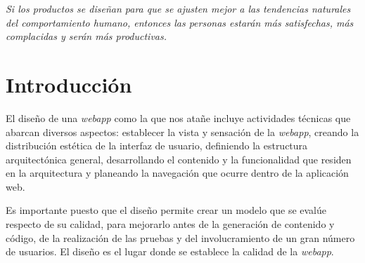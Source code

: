  


		\textit{Si los productos se diseñan para que se ajusten mejor a las tendencias naturales del comportamiento humano, entonces las personas estarán más satisfechas, más complacidas y serán más productivas.}
		
	\section{Introducción} %
	\label{sec:introduccion}
	
		El diseño de una \textit{webapp} como la que nos atañe incluye actividades técnicas que abarcan diversos aspectos: establecer la vista y sensación de la \textit{webapp}, creando la distribución estética de la interfaz de usuario, definiendo la estructura arquitectónica general, desarrollando el contenido y la funcionalidad que residen en la arquitectura y planeando la navegación que ocurre dentro de la aplicación web.
		
		Es importante puesto que el diseño permite crear un modelo que se evalúe respecto de su calidad, para mejorarlo antes de la generación de contenido y código, de la realización de las pruebas y del involucramiento de un gran número de usuarios. El diseño es el lugar donde se establece la calidad de la \textit{webapp}.
		
		
